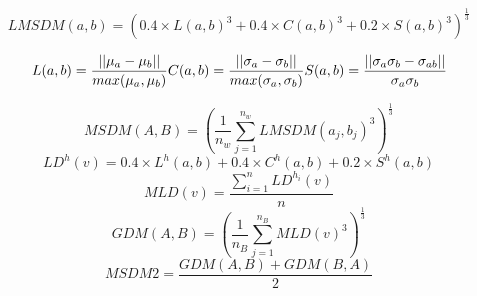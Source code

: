 
\begin{equation}
LMSDM(a,b) = (0.4\times L(a,b)^3+0.4\times C(a,b)^3+0.2\times S(a,b)^3)^{\frac{1}{3}}
\end{equation}

\begin{equation}
 L(a,b) = \frac{||\mu_a-\mu_b||}{max(\mu_a, \mu_b)}\\
 C(a,b) = \frac{||\sigma_a-\sigma_b||}{max(\sigma_a, \sigma_b)}\\
 S(a,b) = \frac{||\sigma_a\sigma_b -\sigma_{ab}||}{\sigma_a\sigma_b}
\end{equation}

\begin{equation}
MSDM(A,B) = (\frac{1}{n_w} \sum_{j=1}^{n_w}{LMSDM(a_j,b_j)^3})^{\frac{1}{3}}
\end{equation}
\begin{equation}
LD^h(v) = 0.4\times L^h(a,b)+0.4\times C^h(a,b)+0.2\times S^h(a,b)
\end{equation}
\begin{equation}
MLD(v) = \frac{\sum_{i=1}^n{LD^{h_i}(v)}}{n}
\end{equation}
\begin{equation}
GDM(A,B) = (\frac{1}{n_B} \sum_{j=1}^{n_B}{MLD(v)^3})^{\frac{1}{3}}
\end{equation}
\begin{equation}
MSDM2 = \frac{GDM(A,B)+GDM(B,A)}{2}
\end{equation}